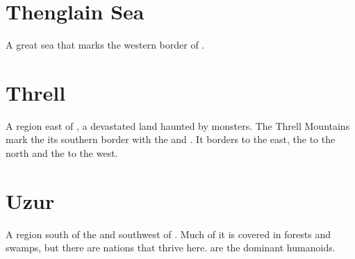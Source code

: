 














\section{Thenglain Sea}
A great sea that marks the western border of . 















\section{Threll}
A region east of , a devastated land haunted by monsters. The Threll Mountains mark the its southern border with the  and . It borders  to the east, the  to the north and the  to the west. 















\section{Uzur}
A region south of the  and southwest of . 
Much of it is covered in  forests and swamps, but there are nations that thrive here. 
\Meccara{} are the dominant humanoids. 

